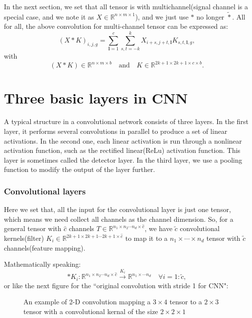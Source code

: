 In the next section, we set that all tensor is with
multichannel(signal channel is a special case, and we note it as $X
\in \mathbb{R}^{n \times m \times 1}$), and we just use $\ast$ no
longer $\tilde{\ast}$. All for all, the  above convolution for multi-channel tensor can be expressed as:
\begin{equation}\label{6.6}
(X \ast K)_{i,j,g} = \sum_{\bm{l}=1}^{c} \sum_{s, t = -k}^k X_{i + s, j + t,\bm{l}} K_{s,t,\bm{l},g},
\end{equation}
with 
\begin{equation}
(X \ast K) \in \mathbb{R}^{n \times m \times b} \quad \text{and} \quad K \in \mathbb{R}^{2k+1 \times 2k+1 \times c \times b}.
\end{equation}











\section{Three basic layers in CNN}
A typical structure in a convolutional network consists of three layers. In the first layer, it performs several convolutions in parallel to produce a set of linear activations. In the second one, each linear activation is run through a nonlinear activation function, such as the rectified linear(ReLu) activation function. This layer is sometimes called the detector layer. In the third layer, we use a pooling function to modify the output of the layer further.
\subsubsection{Convolutional layers}
Here we set that, all the input for the convolutional layer is just one tensor, which means we need collect all channels as the channel dimension. So, for a general tensor with $\hat{c}$ channels $T \in \mathbb{R}^{n_1 \times n_2 \cdots n_d \times \hat{c}}$, we have $\tilde{c}$ convolutional kernels(filter) $K_i \in \mathbb{R}^{2k+1 \times 2k+1 \cdots 2k+1 \times \hat{c}}$ to map it to a $n_1 \times \cdots \times n_d $ tensor with $\tilde c$ channels(feature mapping). 

Mathematically speaking:
\begin{equation}
\ast K_{i}: \mathbb{R}^{n_1 \times n_2 \cdots n_d \times \hat{c}} \xrightarrow{K_i} \mathbb{R}^{n_1 \times  \cdots n_d } \quad \forall i = 1:\tilde c,
\end{equation}
or like the next figure for the ``original convolution with stride 1 for CNN":
\begin{figure}[!htb]        
	\caption{An example of 2-D convolution mapping a $3 \times 4$ tensor to a $2 \times 3$ tensor with a convolutional kernal of the size $ 2 \times 2 \times 1$}      
\end{figure}

